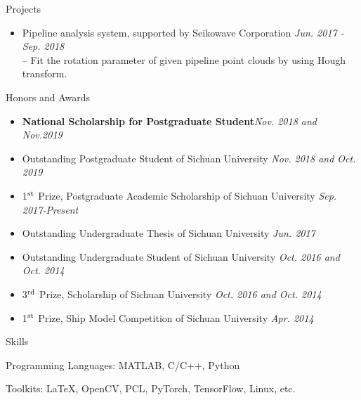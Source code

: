\documentclass{resume} %
\begin{document}
\begin{rSection}{Projects}
\begin{itemize}[leftmargin=*]
		\item  Pipeline analysis system, supported by Seikowave Corporation 
		\hfill {\em Jun. 2017 - Sep. 2018}\vspace{1.5mm}\\		
		-- Fit the rotation parameter of given pipeline point clouds by using Hough transform.
							
	\end{itemize}
\end{rSection}

\begin{rSection}{Honors and Awards}
	\begin{itemize}[leftmargin=*]
		\item \textbf{National Scholarship for Postgraduate Student}\hfill {\em Nov. 2018 and Nov.2019}
		\item Outstanding Postgraduate Student of Sichuan University \hfill {\em Nov. 2018 and Oct. 2019} 
		\item {1$^{\rm st}$} Prize, Postgraduate Academic Scholarship of Sichuan University \hfill {\em Sep. 2017-Present}
		\item Outstanding Undergraduate Thesis of Sichuan University \hfill {\em Jun. 2017}
		\item Outstanding Undergraduate Student of Sichuan University \hfill {\em Oct. 2016 and Oct. 2014} 
		\item {3$^{\rm rd}$} Prize, Scholarship of Sichuan University \hfill {\em Oct. 2016 and Oct. 2014}
		\item {1$^{\rm st}$} Prize, Ship Model Competition of Sichuan University \hfill {\em Apr. 2014}
	\end{itemize}
	
\end{rSection}

\begin{rSection}{Skills}
	\item Programming Languages: MATLAB, C/C++, Python
	\item Toolkits: \LaTeX, OpenCV, PCL, PyTorch, TensorFlow, Linux, etc.
\end{rSection}
\end{document}
